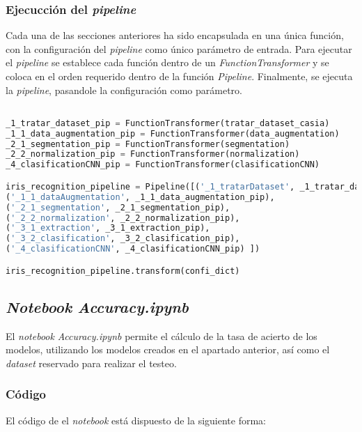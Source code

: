 {\subsubsection{Ejecucción del \textit{pipeline}}

Cada una de las secciones anteriores ha sido encapsulada en una única función, con la configuración del \textit{pipeline} como único parámetro de entrada.
Para ejecutar el \textit{pipeline} se establece cada función dentro de un \textit{FunctionTransformer} y se coloca en el orden requerido dentro de la función \textit{Pipeline}.
Finalmente, se ejecuta la \textit{pipeline}, pasandole la configuración como parámetro.


\begin{lstlisting}[language=Python] 

_1_tratar_dataset_pip = FunctionTransformer(tratar_dataset_casia)
_1_1_data_augmentation_pip = FunctionTransformer(data_augmentation)
_2_1_segmentation_pip = FunctionTransformer(segmentation)
_2_2_normalization_pip = FunctionTransformer(normalization)
_4_clasificationCNN_pip = FunctionTransformer(clasificationCNN)

iris_recognition_pipeline = Pipeline([('_1_tratarDataset', _1_tratar_dataset_pip), 
('_1_1_dataAugmentation', _1_1_data_augmentation_pip), 
('_2_1_segmentation', _2_1_segmentation_pip), 
('_2_2_normalization', _2_2_normalization_pip),
('_3_1_extraction', _3_1_extraction_pip),
('_3_2_clasification', _3_2_clasification_pip), 
('_4_clasificationCNN', _4_clasificationCNN_pip) ])

iris_recognition_pipeline.transform(confi_dict)

\end{lstlisting} 

\subsection{\textit{Notebook} \textit{Accuracy.ipynb}} \label{anx:accuracy}

El \textit{notebook} \textit{Accuracy.ipynb} permite el cálculo de la tasa de acierto de los modelos, utilizando los modelos creados en el apartado anterior,
así como el \textit{dataset} reservado para realizar el testeo.

\subsubsection{Código}

El código de el \textit{notebook} está dispuesto de la siguiente forma:

}
